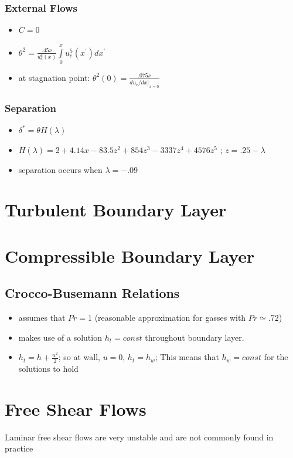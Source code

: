 \documentclass[a4paper]{article}
\begin{document}
    \subsubsection{External Flows}
        \begin{itemize}
            \item $C = 0$
            \item $\theta^2  = \frac{.45 \nu}{u_e^6(x)} \int\limits_0^x u_e^5(x^\prime) dx^\prime$
            \item at stagnation point: $\theta^2(0) = \frac{.075\nu}{\left.du_e/dx \right|_{x=0}}$
        \end{itemize}
    \subsubsection{Separation}
        \begin{itemize}
            \item $\delta^* = \theta H(\lambda)$
            \item $H(\lambda) = 2 + 4.14x - 83.5z^2 + 854z^3 - 3337z^4 + 4576z^5$ ; $z = .25 - \lambda$
            \item separation occurs when $\lambda=-.09$
        \end{itemize}

\section{Turbulent Boundary Layer}

\section{Compressible Boundary Layer}
    \subsection{Crocco-Busemann Relations}
        \begin{itemize}
            \item assumes that $Pr = 1$ (reasonable approximation for gasses with $Pr \simeq .72$)
            \item makes use of a solution $h_t = const$ throughout boundary layer. 
            \item $h_t = h + \frac{u^2}{2}$; so at wall, $u=0$, $h_t = h_w$; This means that $h_w = const$ for the solutions to hold 
        \end{itemize}

\section{Free Shear Flows}
    Laminar free shear flows are very unstable and are not commonly found in practice
\end{document}
